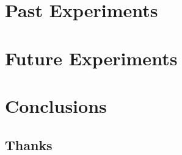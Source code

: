 \section{Past Experiments}
\paragraph{}

\section{Future Experiments}
\paragraph{}

\section{Conclusions}
\paragraph{}

\subsection{Thanks}
\paragraph{}

